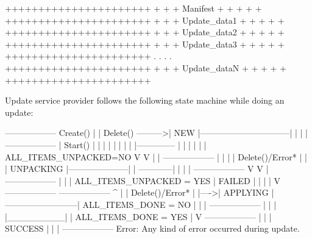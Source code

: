 \begin{DoxyCode}
++++++++++++++++++++++
+                    +
+   Manifest         +
+                    +
+                    +
++++++++++++++++++++++
+                    +
+   Update\_data1     +
+                    +
+                    +
++++++++++++++++++++++
+                    +
+   Update\_data2     +
+                    +
+                    +
++++++++++++++++++++++
+                    +
+   Update\_data3     +
+                    +
+                    +
++++++++++++++++++++++
          .
          .
          .
          .
++++++++++++++++++++++
+                    +
+   Update\_dataN     +
+                    +
+                    +
++++++++++++++++++++++
\end{DoxyCode}


Update service provider follows the following state machine while doing an update\+: 
\begin{DoxyCode}
                      ------------------
            Create()  |                |            Delete()
            --------->|     NEW        |--------------------------------|
                      |                |                                |
                      ------------------                                |
                      Start() |                                         |
                              |                                         |
                              |                                         |
                              |                                         |
          |--------------     |                                         |
          |             |     |                                         |
 ALL\_ITEMS\_UNPACKED=NO  V     V                                         |
          |           ------------------                                |
          |           |                |   Delete()/Error*              |
          |           |   UNPACKING    |---------------------|          |
          ------------|                |                     |          |
                      ------------------                     V          V
                              |                          ------------------
                              |                          |                |
                      ALL\_ITEMS\_UNPACKED = YES           |      FAILED    |
                              |                          |                |
                              V                          ------------------
                      ------------------                          ^
                      |                |     Delete()/Error*      |
                |---->|    APPLYING    |--------------------------|
ALL\_ITEMS\_DONE = NO   |                |
                |     ------------------
                |         |    |
                |\_\_\_\_\_\_\_\_\_|    |
                          ALL\_ITEMS\_DONE = YES
                               |
                               V
                      ------------------
                      |                |
                      |    SUCCESS     |
                      |                |
                      ------------------
Error:  Any kind of error occurred during update.
\end{DoxyCode}
